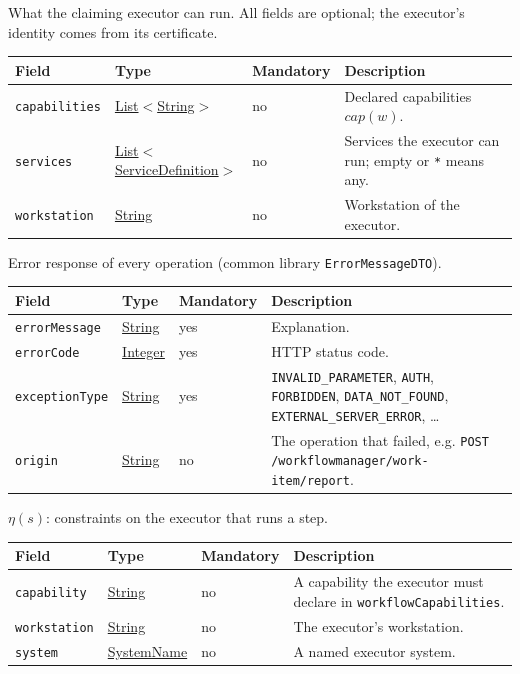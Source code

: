 \documentclass[a4paper]{arrowhead}
\newcommand{\pref}[1]{{\textcolor{ArrowheadGrey}{\hyperref[sec:model:primitives:#1]{#1}}}}
\begin{document}
What the claiming executor can run. All fields are optional; the executor's identity comes from its certificate.

{\small
\begin{longtable}{|p{3.7cm}|p{4.2cm}|p{1.6cm}|p{6.3cm}|}

\hline
\rowcolor{gray!33} Field & Type & Mandatory & Description \\ \hline
\endhead
\texttt{capabilities} & \pref{List}$<$\pref{String}$>$ & no & Declared capabilities $cap(w)$. \\ \hline
\texttt{services} & \pref{List}$<$\pref{ServiceDefinition}$>$ & no & Services the executor can run; empty or \texttt{*} means any. \\ \hline
\texttt{workstation} & \pref{String} & no & Workstation of the executor. \\ \hline
\end{longtable}
}

Error response of every operation (common library \texttt{ErrorMessageDTO}).

{\small
\begin{longtable}{|p{3.7cm}|p{4.2cm}|p{1.6cm}|p{6.3cm}|}

\hline
\rowcolor{gray!33} Field & Type & Mandatory & Description \\ \hline
\endhead
\texttt{errorMessage} & \pref{String} & yes & Explanation. \\ \hline
\texttt{errorCode} & \pref{Integer} & yes & HTTP status code. \\ \hline
\texttt{exceptionType} & \pref{String} & yes & \texttt{INVALID\_PARAMETER}, \texttt{AUTH}, \texttt{FORBIDDEN}, \texttt{DATA\_NOT\_FOUND}, \texttt{EXTERNAL\_SERVER\_ERROR}, \ldots \\ \hline
\texttt{origin} & \pref{String} & no & The operation that failed, e.g. \texttt{POST /workflowmanager/work-item/report}. \\ \hline
\end{longtable}
}

$\eta(s)$: constraints on the executor that runs a step.

{\small
\begin{longtable}{|p{3.7cm}|p{4.2cm}|p{1.6cm}|p{6.3cm}|}

\hline
\rowcolor{gray!33} Field & Type & Mandatory & Description \\ \hline
\endhead
\texttt{capability} & \pref{String} & no & A capability the executor must declare in \texttt{workflowCapabilities}. \\ \hline
\texttt{workstation} & \pref{String} & no & The executor's workstation. \\ \hline
\texttt{system} & \pref{SystemName} & no & A named executor system. \\ \hline
\end{longtable}
}
\end{document}
